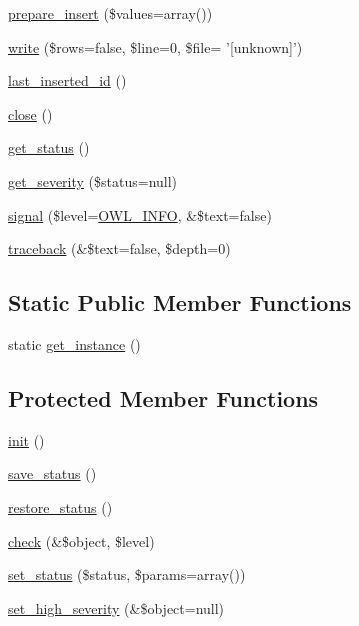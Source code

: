 \begin{DoxyCompactItemize}
\item 
\hyperlink{classDbHandler_a79e3237271c150c4f4f6c2593060567e}{prepare\_\-insert} (\$values=array())
\item 
\hyperlink{classDbHandler_a654166283f0f61f918cc34a5071f838c}{write} (\$rows=false, \$line=0, \$file= '\mbox{[}unknown\mbox{]}')
\item 
\hyperlink{classDbHandler_ad6be57a8dbb86dc1648c79b96128fc97}{last\_\-inserted\_\-id} ()
\item 
\hyperlink{classDbHandler_ad3d2853bbd2d1962710907e34afb424f}{close} ()
\item 
\hyperlink{class__OWL_a99ec771fa2c5c279f80152cc09e489a8}{get\_\-status} ()
\item 
\hyperlink{class__OWL_adf9509ef96858be7bdd9414c5ef129aa}{get\_\-severity} (\$status=null)
\item 
\hyperlink{class__OWL_a51ba4a16409acf2a2f61f286939091a5}{signal} (\$level=\hyperlink{owl_8severitycodes_8php_a139328861128689f2f4def6a399d9057}{OWL\_\-INFO}, \&\$text=false)
\item 
\hyperlink{class__OWL_aa29547995d6741b7d2b90c1d4ea99a13}{traceback} (\&\$text=false, \$depth=0)
\end{DoxyCompactItemize}
\subsection*{Static Public Member Functions}
\begin{DoxyCompactItemize}
\item 
static \hyperlink{classDbHandler_ae9bfc8bdc6a8077adb342702aaffc9af}{get\_\-instance} ()
\end{DoxyCompactItemize}
\subsection*{Protected Member Functions}
\begin{DoxyCompactItemize}
\item 
\hyperlink{class__OWL_ae0ef3ded56e8a6b34b6461e5a721cd3e}{init} ()
\item 
\hyperlink{class__OWL_a9e49b9c76fbc021b244c6915ea536d71}{save\_\-status} ()
\item 
\hyperlink{class__OWL_a465eeaf40edd9f9c848841700c32ce55}{restore\_\-status} ()
\item 
\hyperlink{class__OWL_ad6f4f6946f40199dd0333cf219fa500e}{check} (\&\$object, \$level)
\item 
\hyperlink{class__OWL_aea912d0ede9b3c2a69b79072d94d4787}{set\_\-status} (\$status, \$params=array())
\item 
\hyperlink{class__OWL_a576829692a3b66e3d518853bf43abae3}{set\_\-high\_\-severity} (\&\$object=null)
\end{DoxyCompactItemize}
